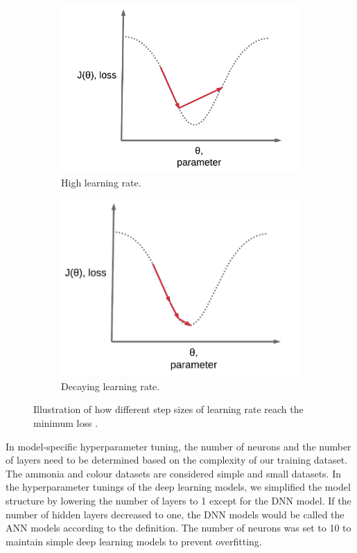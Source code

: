 \begin{figure}[!ht]
\begin{subfigure}[t]{0.45\textwidth}
    \includegraphics[width=\linewidth]{imgs/high-lr.png}
    \caption{High learning rate.} \label{fig:high-lr}
  \end{subfigure}
  \begin{subfigure}[t]{0.45\textwidth}
    \includegraphics[width=\linewidth]{imgs/decay-lr.png}
    \caption{Decaying learning rate.} \label{fig:decay-lr}
  \end{subfigure} 
\caption{Illustration of how different step sizes of learning rate reach the minimum loss \citep{ritchiengDeepLearningWizard2019}.} \label{fig:lr}
\end{figure}

In model-specific hyperparameter tuning, the number of neurons and the number of layers need to be determined based on the complexity of our training dataset. The ammonia and colour datasets are considered simple and small datasets. In the hyperparameter tunings of the deep learning models, we simplified the model structure by lowering the number of layers to 1 except for the DNN model. If the number of hidden layers decreased to one, the DNN models would be called the ANN models according to the definition. The number of neurons was set to 10 to maintain simple deep learning models to prevent overfitting.

